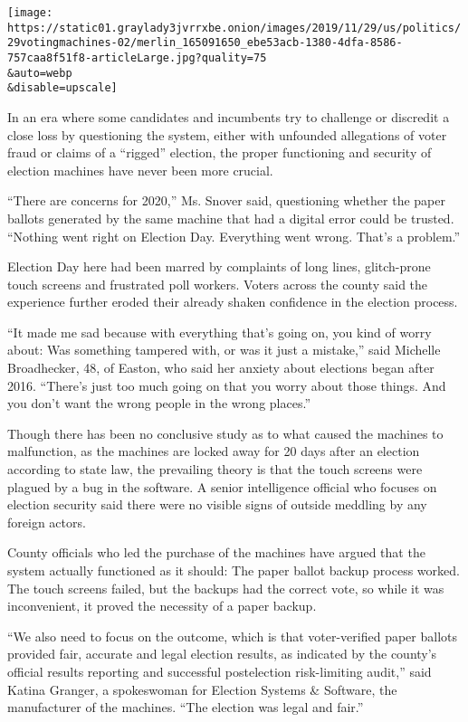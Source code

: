 \texttt{[image: https://static01.graylady3jvrrxbe.onion/images/2019/11/29/us/politics/29votingmachines-02/merlin\_165091650\_ebe53acb-1380-4dfa-8586-757caa8f51f8-articleLarge.jpg?quality=75\\\&auto=webp\\\&disable=upscale]}

In an era where some candidates and incumbents try to challenge or
discredit a close loss by questioning the system, either with unfounded
allegations of voter fraud or claims of a ``rigged'' election, the
proper functioning and security of election machines have never been
more crucial.

``There are concerns for 2020,'' Ms. Snover said, questioning whether
the paper ballots generated by the same machine that had a digital error
could be trusted. ``Nothing went right on Election Day. Everything went
wrong. That's a problem.''

Election Day here had been marred by complaints of long lines,
glitch-prone touch screens and frustrated poll workers. Voters across
the county said the experience further eroded their already shaken
confidence in the election process.

``It made me sad because with everything that's going on, you kind of
worry about: Was something tampered with, or was it just a mistake,''
said Michelle Broadhecker, 48, of Easton, who said her anxiety about
elections began after 2016. ``There's just too much going on that you
worry about those things. And you don't want the wrong people in the
wrong places.''

Though there has been no conclusive study as to what caused the machines
to malfunction, as the machines are locked away for 20 days after an
election according to state law, the prevailing theory is that the touch
screens were plagued by a bug in the software. A senior intelligence
official who focuses on election security said there were no visible
signs of outside meddling by any foreign actors.

County officials who led the purchase of the machines have argued that
the system actually functioned as it should: The paper ballot backup
process worked. The touch screens failed, but the backups had the
correct vote, so while it was inconvenient, it proved the necessity of a
paper backup.

``We also need to focus on the outcome, which is that voter-verified
paper ballots provided fair, accurate and legal election results, as
indicated by the county's official results reporting and successful
postelection risk-limiting audit,'' said Katina Granger, a spokeswoman
for Election Systems \& Software, the manufacturer of the machines.
``The election was legal and fair.''

